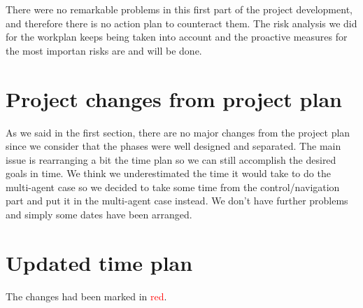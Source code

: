 \documentclass{article}
\begin{document}
There were no remarkable problems in this first part of the project development, and therefore there is no action plan to counteract them. The risk analysis we did for the workplan keeps being taken into account and the proactive measures for the most importan risks are and will be done.

\section{Project changes from project plan}
As we said in the first section, there are no major changes from the project plan since we consider that the phases were well designed and separated. The main issue is rearranging a bit the time plan so we can still accomplish the desired goals in time. We think we underestimated the time it would take to do the multi-agent case so we decided to take some time from the control/navigation part and put it in the multi-agent case instead. We don't have further problems and simply some dates have been arranged.

\newpage
\appendix
\section{Updated time plan}

The changes had been marked in \textcolor{red}{red}. \\
\end{document}
